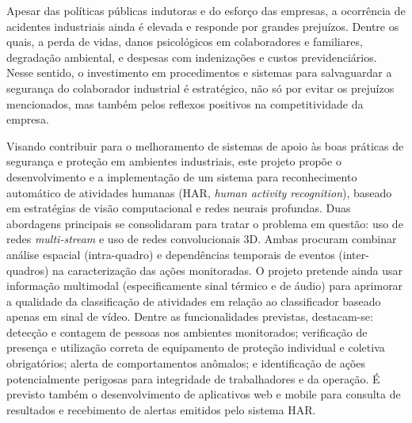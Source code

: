 %
%
% 
Apesar das políticas públicas indutoras e do esforço das empresas, a ocorrência de acidentes industriais ainda é elevada e responde por grandes prejuízos. Dentre os quais, a perda de vidas, danos psicológicos em colaboradores e familiares, degradação ambiental, e despesas com indenizações e custos previdenciários. Nesse sentido, o investimento em procedimentos e sistemas para salvaguardar a segurança do colaborador industrial é estratégico, não só por evitar os prejuízos mencionados, mas também pelos reflexos positivos na competitividade da empresa.
 
Visando contribuir para o melhoramento de sistemas de apoio às boas práticas de segurança e proteção em ambientes industriais, este projeto propõe o desenvolvimento e a implementação de um sistema para reconhecimento automático de atividades humanas (HAR, \emph{human activity recognition}), baseado em estratégias de visão computacional e redes neurais profundas. Duas abordagens principais se consolidaram para tratar o problema em questão: uso de redes \emph{multi-stream} e uso de redes convolucionais 3D. Ambas procuram combinar análise espacial (intra-quadro) e dependências temporais de eventos (inter-quadros) na caracterização das ações monitoradas. O projeto pretende ainda usar informação multimodal (especificamente sinal térmico e de áudio) para aprimorar a qualidade da classificação de atividades em relação ao classificador baseado apenas em sinal de vídeo. Dentre as funcionalidades previstas, destacam-se: detecção e contagem de pessoas nos ambientes monitorados; verificação de presença e utilização correta de equipamento de proteção individual e coletiva obrigatórios; alerta de comportamentos anômalos; e identificação de ações potencialmente perigosas para integridade de trabalhadores e da operação. É previsto também o desenvolvimento de aplicativos web e mobile para consulta de resultados e recebimento de alertas emitidos pelo sistema HAR.

